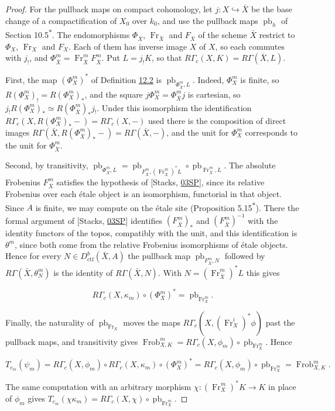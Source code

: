 \documentclass[11pt]{article}
\newcommand{\bpout}[1]{#1\textsuperscript{\hyperlink{bp-outside}{\ensuremath{\ast}}}}
\begin{document}
\begin{proof}[{Proof}]
For the pullback maps on compact cohomology, let \(j:X\hookrightarrow\bar X\) be the base change of a compactification of \(X_0\) over \(k_0\), and use the pullback maps \(\operatorname{pb}_h\) of Section \bpout{10.5}. The endomorphisms \(\Phi_{\bar X}\), \(\operatorname{Fr}_{\bar X}\) and \(F_{\bar X}\) of the scheme \(\bar X\) restrict to \(\Phi_X\), \(\operatorname{Fr}_X\) and \(F_X\). Each of them has inverse image \(X\) of \(X\), so each commutes with \(j_!\), and \(\Phi_{\bar X}^m=\operatorname{Fr}_{\bar X}^mF_{\bar X}^m\). Put \(L=j_!K\), so that \(R\Gamma_c(X,K)=R\Gamma(\bar X,L)\).

First, the map \((\Phi_X^m)^*\) of Definition \hyperref[bp7]{12.2} is \(\operatorname{pb}_{\Phi_{\bar X}^m,L}\). Indeed, \(\Phi_X^m\) is finite, so \(R(\Phi_X^m)_!=R(\Phi_X^m)_*\), and the square \(j\Phi_X^m=\Phi_{\bar X}^mj\) is cartesian, so \(j_!R(\Phi_X^m)_*\simeq R(\Phi_{\bar X}^m)_*j_!\). Under this isomorphism the identification \(R\Gamma_c(X,R(\Phi_X^m)_*-)=R\Gamma_c(X,-)\) used there is the composition of direct images \(R\Gamma(\bar X,R(\Phi_{\bar X}^m)_*-)=R\Gamma(\bar X,-)\), and the unit for \(\Phi_X^m\) corresponds to the unit for \(\Phi_{\bar X}^m\).

Second, by transitivity, \(\operatorname{pb}_{\Phi_{\bar X}^m,L}
 =\operatorname{pb}_{F_{\bar X}^m,(\operatorname{Fr}_{\bar X}^m)^*L}\circ
 \operatorname{pb}_{\operatorname{Fr}_{\bar X}^m,L}\). The absolute Frobenius \(F_{\bar X}^m\) satisfies the hypothesis of [Stacks, \href{https://stacks.math.columbia.edu/tag/03SP}{03SP}], since its relative Frobenius over each étale object is an isomorphism, functorial in that object. Since \(A\) is finite, we may compute on the étale site (Proposition \bpout{5.15}). There the formal argument of [Stacks, \href{https://stacks.math.columbia.edu/tag/03SP}{03SP}] identifies \((F_{\bar X}^m)_*\) and \((F_{\bar X}^m)^{-1}\) with the identity functors of the topos, compatibly with the unit, and this identification is \(\theta^m\), since both come from the relative Frobenius isomorphisms of étale objects. Hence for every \(N\in D^b_{\mathrm{ctf}}(\bar X,A)\) the pullback map \(\operatorname{pb}_{F_{\bar X}^m,N}\) followed by \(R\Gamma(\bar X,\theta^m_N)\) is the identity of \(R\Gamma(\bar X,N)\). With \(N=(\operatorname{Fr}_{\bar X}^m)^*L\) this gives

\[
R\Gamma_c(X,\kappa_m)\circ(\Phi_X^m)^*=\operatorname{pb}_{\operatorname{Fr}_X^m} .
\]

Finally, the naturality of \(\operatorname{pb}_{\operatorname{Fr}_X}\) moves the maps \(R\Gamma_c(X,(\operatorname{Fr}_X^i)^*\phi)\) past the pullback maps, and transitivity gives \(\operatorname{Frob}_{X,K}^m=R\Gamma_c(X,\phi_m)\circ\operatorname{pb}_{\operatorname{Fr}_X^m}\). Hence

\[
T_{c_m}(\psi_m)=R\Gamma_c(X,\phi_m)\circ R\Gamma_c(X,\kappa_m)\circ(\Phi_X^m)^*
=R\Gamma_c(X,\phi_m)\circ\operatorname{pb}_{\operatorname{Fr}_X^m}
=\operatorname{Frob}_{X,K}^m .
\]

The same computation with an arbitrary morphism \(\chi:(\operatorname{Fr}_X^m)^*K\to K\) in place of \(\phi_m\) gives \(T_{c_m}(\chi\kappa_m)=R\Gamma_c(X,\chi)\circ\operatorname{pb}_{\operatorname{Fr}_X^m}\).
\end{proof}
\end{document}
